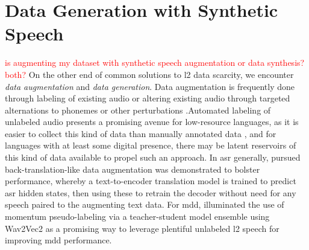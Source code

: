 \documentclass[thesis]{cluu}
\newcommand{\todo}[1]{\textcolor{red}{#1}}
\begin{document}
\section{Data Generation with Synthetic Speech}
\todo{is augmenting my dataset with synthetic speech augmentation or data synthesis? both?}
On the other end of common solutions to \gls{l2} data scarcity, we encounter \textit{data augmentation} and \textit{data generation}. Data augmentation is frequently done through labeling of existing audio \parencite[see][inter alia]{xuIterativePseudoLabelingSpeech2020,yangImprovingMispronunciationDetection2022,barteldsMakingMoreLittle2023} or altering existing audio through targeted alternations to phonemes or other perturbations \parencite{kheirAutomaticPronunciationAssessment2023}.Automated labeling of unlabeled audio presents a promising avenue for low-resource languages, as it is easier to collect this kind of data than manually annotated data \parencite{barteldsMakingMoreLittle2023}, and for languages with at least some digital presence, there may be latent reservoirs of this kind of data available to propel such an approach. In \gls{asr} generally, \textcite{hayashiBackTranslationStyleDataAugmentation2018} pursued back-translation-like data augmentation was demonstrated to bolster performance, whereby a text-to-encoder translation model is trained to predict \gls{asr} hidden states, then using these to retrain the decoder without need for any speech paired to the augmenting text data. For \gls{mdd}, \textcite{yangImprovingMispronunciationDetection2022} illuminated the use of momentum pseudo-labeling via a teacher-student model ensemble using Wav2Vec2 as a promising way to leverage plentiful unlabeled \gls{l2} speech for improving \gls{mdd} performance.
\end{document}
